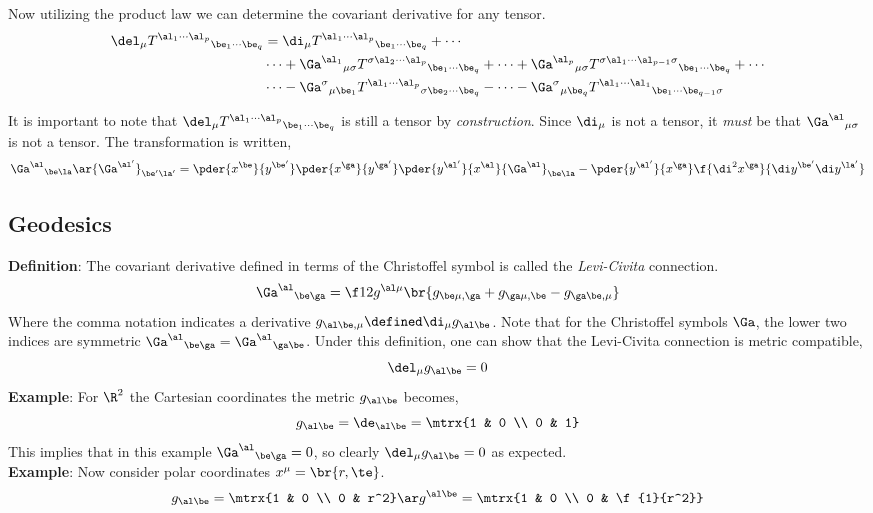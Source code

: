 \documentclass{article}
\begin{document}
Now utilizing the product law we can determine the covariant derivative for any tensor.
\begin{align*}
\del_\mu {T^{\al_1 \cdots \al_p}}_{\be_1\cdots\be_q} &= \di_\mu {T^{\al_1 \cdots \al_p}}_{\be_1\cdots\be_q} + \cdots \\
 &\cdots + {\Ga^{\al_1}}_{\mu\sigma}{T^{\sigma \al_2 \cdots \al_p}}_{\be_1\cdots\be_q} + \cdots + {\Ga^{\al_p}}_{\mu\sigma}{T^{\sigma \al_1 \cdots \al_{p-1} \sigma}}_{\be_1\cdots\be_q} + \cdots \\
 &\cdots - {\Ga^{\sigma}}_{\mu\be_1}{T^{\al_1 \cdots \al_p}}_{\sigma\be_2\cdots\be_q} - \cdots - {\Ga^{\sigma}}_{\mu\be_q}{T^{\al_1 \cdots \al_1}}_{\be_1\cdots\be_{q-1}\sigma} \\
\end{align*}

It is important to note that $\del_\mu {T^{\al_1 \cdots \al_p}}_{\be_1\cdots\be_q}$ is still a tensor by \textit{construction}. Since $\di_\mu$ is not a tensor, it \textit{must} be that ${\Ga^\al}_{\mu\sigma}$ is not a tensor. The transformation is written, \\
\[ {\Ga^\al}_{\be\la} \ar {\Ga^{\al'}}_{\be'\la'} = \pder{x^\be}{y^{\be'}}\pder{x^\ga}{y^{\ga'}}\pder{y^{\al'}}{x^{\al}} {\Ga^\al}_{\be\la} - \pder{y^{\al'}}{x^{\ga}}\f{\di^2 x^{\ga}}{\di y^{\be'}\di y^{\la'}}  \]

\subsection{Geodesics}

\textbf{Definition}: The covariant derivative defined in terms of the Christoffel symbol is called the \textit{Levi-Civita} connection.
\[ {\Ga^\al}_{\be\ga} = \f12 g^{\al\mu}\br{g_{\be\mu,\ga} + g_{\ga\mu,\be} - g_{\ga\be,\mu}} \]
Where the comma notation indicates a derivative $g_{\al\be,\mu} \defined \di_\mu g_{\al\be}$. Note that for the Christoffel symbols $\Ga$, the lower two indices are symmetric ${\Ga^\al}_{\be\ga} = {\Ga^\al}_{\ga\be}$. Under this definition, one can show that the Levi-Civita connection is metric compatible,
\[ \del_\mu g_{\al\be} = 0 \]
\textbf{Example}: For $\R^2$ the Cartesian coordinates the metric $g_{\al\be}$ becomes,
\[ g_{\al\be}  = \de_{\al\be} = \mtrx{1 & 0 \\ 0 & 1} \]
This implies that in this example ${\Ga^\al}_{\be\ga} = 0$, so clearly $\del_\mu g_{\al\be} = 0$ as expected.\\

\textbf{Example}: Now consider polar coordinates $x^\mu = \br{r ,\te}$.
\[ g_{\al\be} = \mtrx{1 & 0 \\ 0 & r^2} \ar g^{\al\be} = \mtrx{1 & 0 \\ 0 & \f{1}{r^2}} \]
\end{document}
